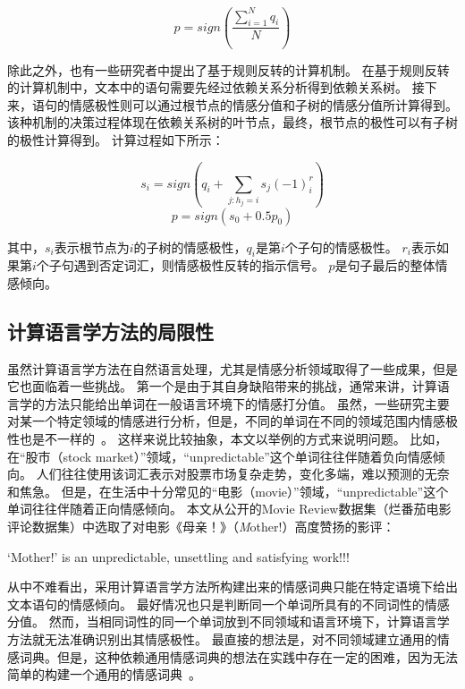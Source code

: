 \begin{equation}
p = sign\left(\frac{\sum_{i=1}^{N}q_{i}}{N}\right)
\label{eq:fairscore}
\end{equation}

除此之外，也有一些研究者中提出了基于规则反转的计算机制。
在基于规则反转的计算机制中，文本中的语句需要先经过依赖关系分析得到依赖关系树。
接下来，语句的情感极性则可以通过根节点的情感分值和子树的情感分值所计算得到。
该种机制的决策过程体现在依赖关系树的叶节点，最终，根节点的极性可以有子树的极性计算得到。
计算过程如下所示：

\begin{equation}
s_{i}=sign\left ( q_{i}+\sum_{j:h_{j}=i}s_{j}\left ( -1 \right )_{i}^{r} \right )
\end{equation}
\begin{equation}
p=sign\left ( s_{0} +0.5p_{0}\right )
\end{equation}

其中，${s_{i}}$表示根节点为${i}$的子树的情感极性，${q_{i}}$是第${i}$个子句的情感极性。
${r_{i}}$表示如果第${i}$个子句遇到否定词汇，则情感极性反转的指示信号。
${p}$是句子最后的整体情感倾向。

\subsection{计算语言学方法的局限性}
虽然计算语言学方法在自然语言处理，尤其是情感分析领域取得了一些成果，但是它也面临着一些挑战。
第一个是由于其自身缺陷带来的挑战，通常来讲，计算语言学的方法只能给出单词在一般语言环境下的情感打分值。
虽然，一些研究主要对某一个特定领域的情感进行分析，但是，不同的单词在不同的领域范围内情感极性也是不一样的~。
这样来说比较抽象，本文以举例的方式来说明问题。
比如，在“股市（stock market）”领域，“unpredictable”这个单词往往伴随着负向情感倾向。
人们往往使用该词汇表示对股票市场复杂走势，变化多端，难以预测的无奈和焦急。
但是，在生活中十分常见的“电影（movie）”领域，“unpredictable”这个单词往往伴随着正向情感倾向。
本文从公开的Movie Review数据集（烂番茄电影评论数据集）中选取了对电影《母亲！》（\emph Mother!）高度赞扬的影评：

\begin{description}
\item ‘Mother!’ is an unpredictable, unsettling and satisfying work!!!
\end{description}

从中不难看出，采用计算语言学方法所构建出来的情感词典只能在特定语境下给出文本语句的情感倾向。
最好情况也只是判断同一个单词所具有的不同词性的情感分值。
然而，当相同词性的同一个单词放到不同领域和语言环境下，计算语言学方法就无法准确识别出其情感极性。
最直接的想法是，对不同领域建立通用的情感词典。但是，这种依赖通用情感词典的想法在实践中存在一定的困难，因为无法简单的构建一个通用的情感词典~。

